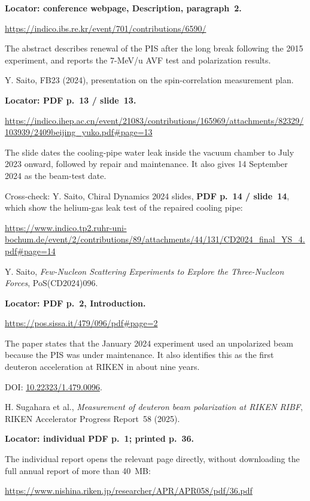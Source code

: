 \documentclass[11pt,a4paper]{article}
\begin{document}
\begin{enumerate}[label={\textbf{[\arabic*]}},leftmargin=2.7em,itemsep=0.8em]
\textbf{Locator: conference webpage, Description, paragraph~2.}

\url{https://indico.ibs.re.kr/event/701/contributions/6590/}

The abstract describes renewal of the PIS after the long break following the 2015 experiment, and reports the 7-MeV/u AVF test and polarization results.

\item Y. Saito, FB23 (2024), presentation on the spin-correlation measurement plan.

\textbf{Locator: PDF p.~13 / slide~13.}

\url{https://indico.ihep.ac.cn/event/21083/contributions/165969/attachments/82329/103939/2409beijing_yuko.pdf#page=13}

The slide dates the cooling-pipe water leak inside the vacuum chamber to July 2023 onward, followed by repair and maintenance. It also gives 14 September 2024 as the beam-test date.

Cross-check: Y. Saito, Chiral Dynamics 2024 slides, \textbf{PDF p.~14 / slide~14}, which show the helium-gas leak test of the repaired cooling pipe:

\url{https://www.indico.tp2.ruhr-uni-bochum.de/event/2/contributions/89/attachments/44/131/CD2024_final_YS_4.pdf#page=14}

\item Y. Saito, \emph{Few-Nucleon Scattering Experiments to Explore the Three-Nucleon Forces}, PoS(CD2024)096.

\textbf{Locator: PDF p.~2, Introduction.}

\url{https://pos.sissa.it/479/096/pdf#page=2}

The paper states that the January 2024 experiment used an unpolarized beam because the PIS was under maintenance. It also identifies this as the first deuteron acceleration at RIKEN in about nine years.

DOI: \href{https://doi.org/10.22323/1.479.0096}{10.22323/1.479.0096}.

\item H. Sugahara et al., \emph{Measurement of deuteron beam polarization at RIKEN RIBF}, RIKEN Accelerator Progress Report~58 (2025).

\textbf{Locator: individual PDF p.~1; printed p.~36.}

The individual report opens the relevant page directly, without downloading the full annual report of more than 40~MB:

\url{https://www.nishina.riken.jp/researcher/APR/APR058/pdf/36.pdf}


\end{enumerate}
\end{document}
